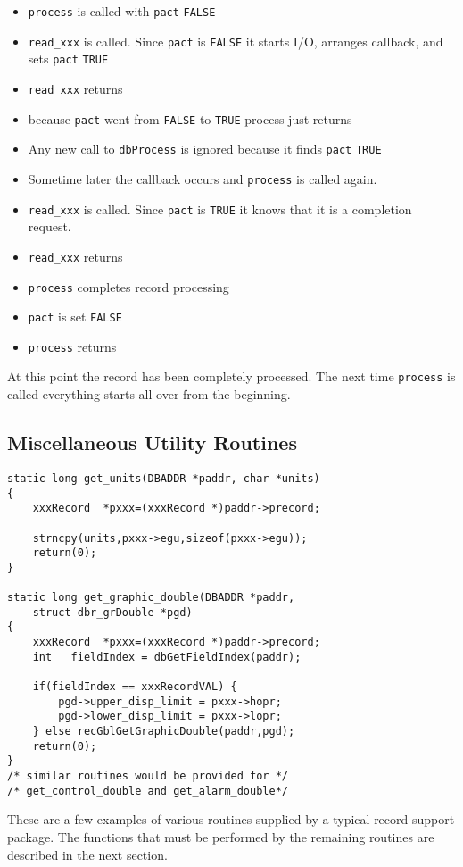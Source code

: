 \begin{itemize}\item \verb|process| is called with \verb|pact| \verb|FALSE|

\item \verb|read_xxx| is called. Since \verb|pact| is \verb|FALSE| it starts I/O, arranges callback, and sets \verb|pact| \verb|TRUE|

\item \verb|read_xxx| returns

\item because \verb|pact| went from \verb|FALSE| to \verb|TRUE| process just returns

\item Any new call to \verb|dbProcess| is ignored because it finds \verb|pact| \verb|TRUE|

\item Sometime later the callback occurs and \verb|process| is called again.

\item \verb|read_xxx| is called. Since \verb|pact| is \verb|TRUE| it knows that it is a completion request.

\item \verb|read_xxx| returns

\item \verb|process| completes record processing

\item \verb|pact| is set \verb|FALSE|

\item \verb|process| returns

\end{itemize}At this point the record has been completely processed. The next time \verb|process| is called everything starts all over from 
the beginning.

\subsection{Miscellaneous Utility Routines}

\begin{verbatim}
static long get_units(DBADDR *paddr, char *units)
{
    xxxRecord  *pxxx=(xxxRecord *)paddr->precord;

    strncpy(units,pxxx->egu,sizeof(pxxx->egu));
    return(0);
}

static long get_graphic_double(DBADDR *paddr,
    struct dbr_grDouble *pgd)
{
    xxxRecord  *pxxx=(xxxRecord *)paddr->precord;
    int   fieldIndex = dbGetFieldIndex(paddr);

    if(fieldIndex == xxxRecordVAL) {
        pgd->upper_disp_limit = pxxx->hopr;
        pgd->lower_disp_limit = pxxx->lopr;
    } else recGblGetGraphicDouble(paddr,pgd);
    return(0);
}
/* similar routines would be provided for */
/* get_control_double and get_alarm_double*/
\end{verbatim}
These are a few examples of various routines supplied by a typical record support package. The functions that must be 
performed by the remaining routines are described in the next section.

